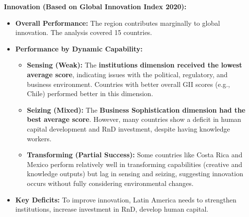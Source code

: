 \documentclass{article}
\begin{document}
    \noindent \textbf{Innovation (Based on Global Innovation Index 2020):}
    \begin{itemize}
        \item \textbf{Overall Performance:} The region contributes
        marginally to global innovation. The analysis covered 15 countries.
        \item \textbf{Performance by Dynamic Capability:}
        \begin{itemize}
            \item \textbf{Sensing (Weak):} The
            \textbf{institutions dimension received the lowest average score}, indicating issues with the political, regulatory, and business environment. Countries with better overall GII scores (e.g., Chile) performed better in this dimension.
            \item \textbf{Seizing (Mixed):} The
            \textbf{Business Sophistication dimension had the best average score}. However, many countries show a deficit in human capital development and RnD investment, despite having knowledge workers.
            \item \textbf{Transforming (Partial Success):} Some countries
            like Costa Rica and Mexico perform relatively well in
            transforming capabilities (creative and knowledge outputs) but
            lag in sensing and seizing, suggesting innovation occurs without
            fully considering environmental changes.
        \end{itemize}
        \item \textbf{Key Deficits:} To improve innovation, Latin America
        needs to strengthen institutions, increase investment in RnD,
        develop human capital.
    \end{itemize}
\end{document}
